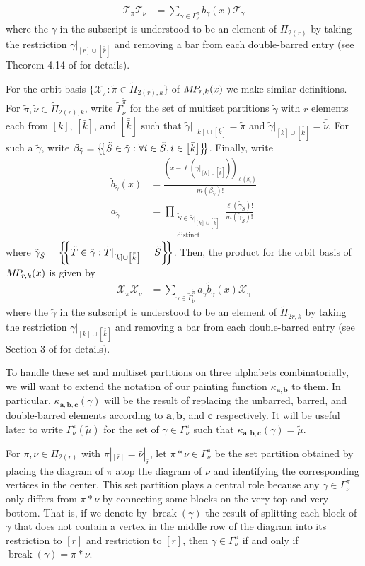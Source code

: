 \documentclass[10pt]{amsart}
\theoremstyle{definition}
\theoremstyle{definition}
\theoremstyle{plain}
\theoremstyle{remark}
\theoremstyle{plain}
\theoremstyle{plain}
\newcommand{\TT}{\mathcal{T}}
\newcommand{\XX}{\mathcal{X}}
\newcommand{\bfa}{{\boldsymbol{a}}}
\newcommand{\bfb}{{\boldsymbol{b}}}
\newcommand{\bfc}{{\boldsymbol{c}}}
\newcommand{\MP}{{\rm M\!P\!}}
\newcommand{\tpi}{{\tilde{\pi}}}
\newcommand{\tgamma}{{\tilde{\gamma}}}
\newcommand{\tmu}{{\tilde{\mu}}}
\newcommand{\tnu}{{\tilde{\nu}}}
\newcommand{\tS}{{\tilde{S}}}
\newcommand{\tT}{{\tilde{T}}}
\newcommand{\multi}[1]{\left\{\mskip-5mu\left\{#1\right\}\mskip-5mu\right\}}
\newcommand{\ov}[1]{\bar{#1}}
\newcommand{\ovb}[1]{\left[\ov{#1}\right]}
\newcommand{\ovov}[1]{\bar{\bar{#1}}}
\newcommand{\ovovb}[1]{\left[\ovov{#1}\right]}
\newcommand{\defn}[1]{\textcolor{defncolor}{\emph{#1}}}
\DeclareMathOperator{\Break}{break}
\begin{document}
\begin{align*}
    \TT_\pi \TT_\nu&=\sum_{\gamma\in\Gamma^\pi_\nu}b_\gamma(x)\TT_\gamma
\end{align*} where the $\gamma$ in the subscript is understood to be an element of $\Pi_{2(r)}$ by taking the restriction $\gamma|_{[r]\cup\ovovb{r}}$ and removing a bar from each double-barred entry (see Theorem 4.14 of \cite{Benkart2019PartitionAA} for details).

For the orbit basis $\{\XX_\tpi:\tpi\in\tilde\Pi_{2(r),k}\}$ of $\MP_{r,k}(x)$ we make similar definitions. For $\tpi,\tnu\in\tilde\Pi_{2(r),k}$, write $\tilde\Gamma^\tpi_\tnu$ for the set of multiset partitions $\tgamma$ with $r$ elements each from $[k]$, $\ovb{k}$, and $\ovovb{k}$ such that $\tgamma|_{[k]\cup\ovb{k}}=\tpi$ and $\tgamma|_{\ovb{k}\cup\ovovb{k}}=\ov\tnu$. For such a $\tgamma$, write $\beta_\tgamma=\multi{\tS\in\tgamma:\forall i\in \tS, i\in\ovb{k}}$. Finally, write \begin{align*}
    \tilde{b}_\tgamma(x)&=\frac{(x-\ell(\tgamma|_{[k]\cup\ovovb{k}}))_{\ell(\beta_\tgamma)}}{m(\beta_\tgamma)!}\\
    a_\tgamma&=\prod_{\substack{\tS\in\tgamma|_{[k]\cup\ovovb{k}}\\\text{distinct}}}\frac{\ell(\tgamma_\tS)!}{m(\tgamma_\tS)!}
\end{align*} where $\tgamma_\tS=\multi{\tT\in\tgamma:\tT|_{[k]\cup\ovovb{k}}=\tS}$. Then, the product for the orbit basis of $\MP_{r,k}(x)$ is given by \begin{align*}
    \XX_\tpi \XX_\tnu &=\sum_{\tgamma\in\tilde\Gamma^\tpi_\tnu} a_\tgamma \tilde{b}_\tgamma(x) \XX_\tgamma
\end{align*} where the $\tgamma$ in the subscript is understood to be an element of $\tilde{\Pi}_{2r,k}$ by taking the restriction $\gamma|_{[k]\cup\ovovb{k}}$ and removing a bar from each double-barred entry (see Section 3 of \cite{orellana2020howe} for details).

To handle these set and multiset partitions on three alphabets combinatorially, we will want to extend the notation of our painting function $\kappa_{\bfa,\bfb}$ to them. In particular, $\kappa_{\bfa,\bfb,\bfc}(\gamma)$ will be the result of replacing the unbarred, barred, and double-barred elements according to $\bfa,\bfb$, and $\bfc$ respectively. It will be useful later to write $\Gamma_\nu^\pi(\tmu)$ for the set of $\gamma\in\Gamma_\nu^\pi$ such that $\kappa_{\bfa,\bfb,\bfc}(\gamma)=\tmu$.

For $\pi,\nu\in\Pi_{2(r)}$ with $\pi|_{\ovb{r}}=\ov\nu|_{\ov r}$, let $\pi\ast\nu\in\Gamma^\pi_\nu$ be the set partition obtained by placing the diagram of $\pi$ atop the diagram of $\nu$ and identifying the corresponding vertices in the center. This set partition plays a central role because any $\gamma\in\Gamma^\pi_\nu$ only differs from $\pi\ast\nu$ by connecting some blocks on the very top and very bottom. That is, if we denote by \defn{$\Break(\gamma)$} the result of splitting each block of $\gamma$ that does not contain a vertex in the middle row of the diagram into its restriction to $[r]$ and restriction to $\ovb{r}$, then $\gamma\in\Gamma^\pi_\nu$ if and only if $\Break(\gamma)=\pi\ast\nu$.
\end{document}
